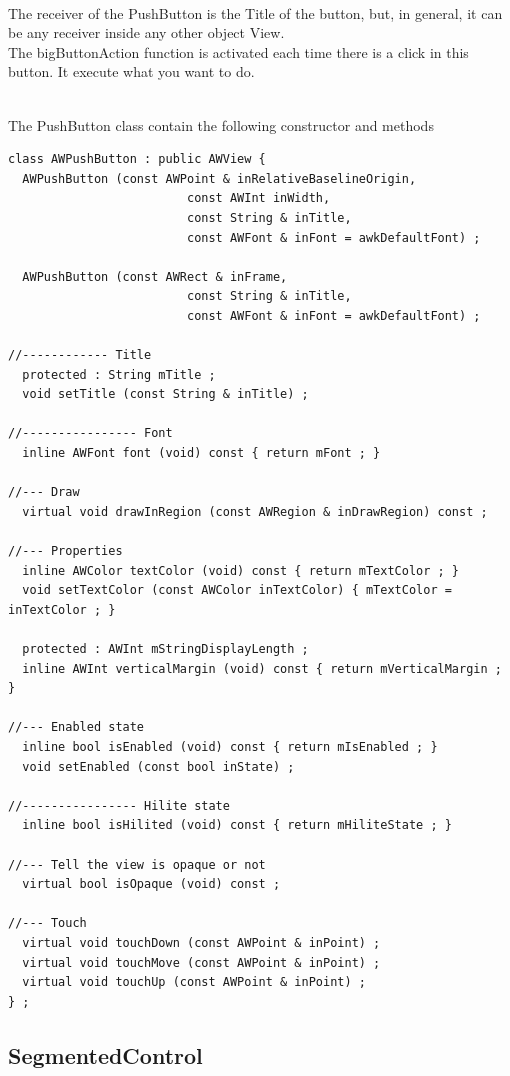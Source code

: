 \documentclass[a4paper,11pt]{extarticle}
\begin{document}
~\\ The receiver of the PushButton is the Title of the button, but, in general, it can be any receiver inside any other object View.
~\\ The bigButtonAction function is activated each time there is a click in this button. It execute what you want to do.

~\\ The PushButton class contain the following constructor and methods

\begin{lstlisting}[language=Arduinonl]
class AWPushButton : public AWView {
  AWPushButton (const AWPoint & inRelativeBaselineOrigin,
                         const AWInt inWidth,
                         const String & inTitle,
                         const AWFont & inFont = awkDefaultFont) ;
  
  AWPushButton (const AWRect & inFrame,
                         const String & inTitle,
                         const AWFont & inFont = awkDefaultFont) ;
  
//------------ Title
  protected : String mTitle ;
  void setTitle (const String & inTitle) ;

//---------------- Font
  inline AWFont font (void) const { return mFont ; }

//--- Draw
  virtual void drawInRegion (const AWRegion & inDrawRegion) const ;

//--- Properties
  inline AWColor textColor (void) const { return mTextColor ; }
  void setTextColor (const AWColor inTextColor) { mTextColor = inTextColor ; }
  
  protected : AWInt mStringDisplayLength ;
  inline AWInt verticalMargin (void) const { return mVerticalMargin ; }

//--- Enabled state
  inline bool isEnabled (void) const { return mIsEnabled ; }
  void setEnabled (const bool inState) ;

//---------------- Hilite state
  inline bool isHilited (void) const { return mHiliteState ; }

//--- Tell the view is opaque or not
  virtual bool isOpaque (void) const ;

//--- Touch
  virtual void touchDown (const AWPoint & inPoint) ;
  virtual void touchMove (const AWPoint & inPoint) ;
  virtual void touchUp (const AWPoint & inPoint) ;
} ;
\end{lstlisting}


\newpage
\subsection{SegmentedControl}
\end{document}

